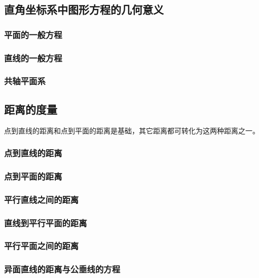 \documentclass[onecolumn]{ctexart}
\begin{document}
\subsection{直角坐标系中图形方程的几何意义}

\subsubsection{平面的一般方程}

\subsubsection{直线的一般方程}

\subsubsection{共轴平面系}

\subsection{距离的度量}
点到直线的距离和点到平面的距离是基础，其它距离都可转化为这两种距离之一。

\subsubsection{点到直线的距离}

\subsubsection{点到平面的距离}

\subsubsection{平行直线之间的距离}

\subsubsection{直线到平行平面的距离}

\subsubsection{平行平面之间的距离}

\subsubsection{异面直线的距离与公垂线的方程}
\end{document}

